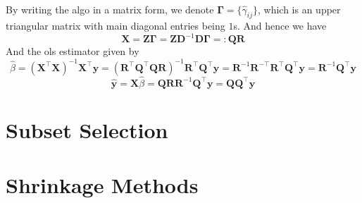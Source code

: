 \documentclass[a4paper, 11pt]{article}
\begin{document}
\begin{itemize}
	~\\
	By writing the algo in a matrix form, we denote $\bm{\Gamma}=\{\hat{\gamma}_{ij}\}$, which is an upper triangular matrix with main diagonal entries being $1$s. And hence we have
	$$
	\bm{X} = \bm{Z\Gamma} = \bm{ZD}^{-1} \bm{D\Gamma} =: \bm{QR}
	$$
	And the ols estimator given by
	$$
	\hat{\beta} = (\bm{X}^{\top}\bm{X})^{-1} \bm{X}^{\top} \bm{y} = (\bm{R}^{\top}\bm{Q}^{\top}\bm{QR})^{-1} \bm{R}^{\top} \bm{Q}^{\top} \bm{y} = \bm{R}^{-1} \bm{R}^{-\top} \bm{R}^{\top} \bm{Q}^{\top} \bm{y} = \bm{R}^{-1} \bm{Q}^{\top} \bm{y}
	$$
	$$
	\hat{\bm{y}} = \bm{X}\hat{\beta} = \bm{QR}\bm{R}^{-1} \bm{Q}^{\top} \bm{y} = \bm{Q}\bm{Q}^{\top} \bm{y}
	$$
\end{itemize}


\section{Subset Selection}

\section{Shrinkage Methods}
\end{document}
